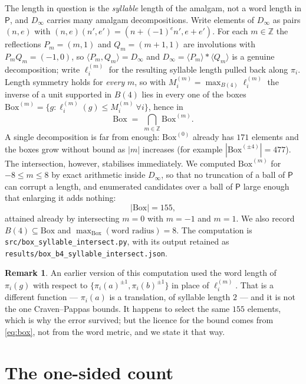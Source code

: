 \documentclass[11pt]{amsart}
\theoremstyle{definition}
\newtheorem{remark}[theorem]{Remark}
\newcommand{\Z}{\mathbb{Z}}
\renewcommand{\P}{\mathsf{P}}
\newcommand{\Ball}[1]{B(#1)}
\newcommand{\BOX}{\mathrm{Box}}
\begin{document}
The length in question is the \emph{syllable} length of the amalgam, not a word
length in $\P$, and $D_\infty$ carries many amalgam decompositions. Write
elements of $D_\infty$ as pairs $(n,e)$ with $(n,e)(n',e')=(n+(-1)^{e}n',e+e')$.
For each $m\in\Z$ the reflections $P_m=(m,1)$ and $Q_m=(m+1,1)$ are involutions
with $P_mQ_m=(-1,0)$, so $\langle P_m,Q_m\rangle=D_\infty$ and
$D_\infty=\langle P_m\rangle *\langle Q_m\rangle$ is a genuine decomposition;
write $\ell^{(m)}_i$ for the resulting syllable length pulled back along
$\pi_i$. Length symmetry holds for \emph{every} $m$, so with
$M^{(m)}_i=\max_{\Ball4}\ell^{(m)}_i$ the inverse of a unit supported in
$\Ball4$ lies in every one of the boxes
$\BOX^{(m)}=\{g:\ell^{(m)}_i(g)\le M^{(m)}_i\ \forall i\}$, hence in
\begin{equation}\label{eq:box}
  \BOX \;=\; \bigcap_{m\in\Z}\BOX^{(m)} .
\end{equation}
A single decomposition is far from enough: $\BOX^{(0)}$ already has $171$
elements and the boxes grow without bound as $|m|$ increases (for example
$|\BOX^{(\pm4)}|=477$). The intersection, however, stabilises immediately. We
computed $\BOX^{(m)}$ for $-8\le m\le 8$ by exact arithmetic inside $D_\infty$,
so that no truncation of a ball of $\P$ can corrupt a length, and enumerated
candidates over a ball of $\P$ large enough that enlarging it adds nothing:
\[
  |\BOX| = 155 ,
\]
attained already by intersecting $m=0$ with $m=-1$ and $m=1$. We also record
$\Ball4\subseteq\BOX$ and $\max_{\BOX}(\text{word radius})=8$. The computation
is \texttt{src/box\_syllable\_intersect.py}, with its output retained as
\texttt{results/box\_b4\_syllable\_intersect.json}.

\begin{remark}
An earlier version of this computation used the word length of $\pi_i(g)$ with
respect to $\{\pi_i(a)^{\pm1},\pi_i(b)^{\pm1}\}$ in place of $\ell^{(m)}_i$.
That is a different function --- $\pi_i(a)$ is a translation, of syllable length
$2$ --- and it is not the one Craven--Pappas bounds. It happens to select the
same $155$ elements, which is why the error survived; but the licence for the
bound comes from \eqref{eq:box}, not from the word metric, and we state it that
way.
\end{remark}

\section{The one-sided count}\label{sec:census}
\end{document}

